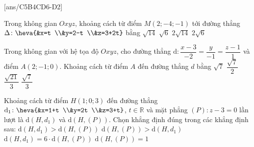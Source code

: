 \TN
{}[ans/C5B4CD6-D2]
\begin{ex}%
	Trong không gian $Oxyz$, khoảng cách từ điểm $M(2;-4;-1)$ tới đường thẳng $\Delta\colon \heva{&x=t \\&y=2-t \\&z=3+2t}$ bằng
	\choice
	{$\sqrt{14}$}
	{$\sqrt{6}$}
	{\True $2\sqrt{14}$}
	{$2\sqrt{6}$}
\end{ex}
\begin{ex}%
	Trong không gian với hệ tọa độ $Oxyz$, cho đường thẳng $\mathrm{d}\colon\dfrac{x-3}{-2}=\dfrac{y}{-1}=\dfrac{z-1}{1}$ và điểm $A(2;-1;0)$. Khoảng cách từ điểm $A$ đến đường thẳng $d$ bằng
	\choice
	{$\sqrt{7}$}
	{$\dfrac{\sqrt{7}}{2}$}
	{\True $\dfrac{\sqrt{21}}{3}$}
	{$\dfrac{\sqrt{7}}{3}$}
\end{ex}
\begin{ex}%
	Khoảng cách từ điểm $H(1;0;3)$ đến đường thẳng $\mathrm{d}_1\colon \heva{&x=1+t \\&y=2t \\&z=3+t}$, $t\in \mathbb{R}$ và mặt phẳng $(P)\colon z-3=0$ lần lượt là $\mathrm{d}(H,d_1)$ và $\mathrm{d}(H,(P))$. Chọn khẳng định đúng trong các khẳng định sau:
	\choice
	{$\mathrm{d}(H,d_1)>\mathrm{d}(H,(P))$}
	{$\mathrm{d}(H,(P))>\mathrm{d}(H,d_1)$}
	{\True $\mathrm{d}(H,d_1)=6\cdot \mathrm{d}(H,(P))$}
	{$\mathrm{d}(H,(P))=1$}
\end{ex}

